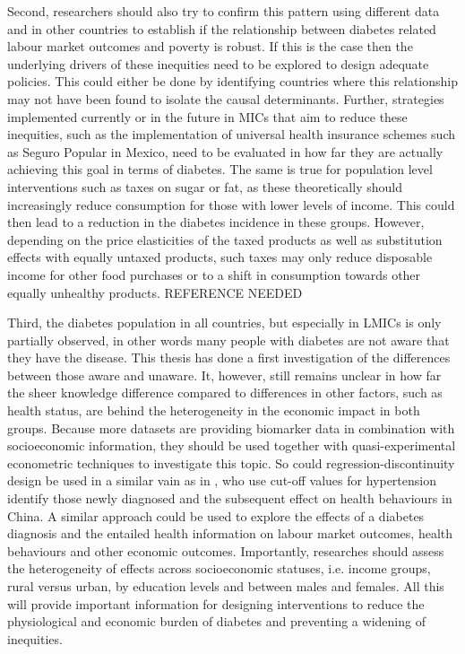 Second, researchers should also try to confirm this pattern using different data and in other countries to establish if the relationship between diabetes related labour market outcomes and poverty is robust. If this is the case then the underlying drivers of these inequities need to be explored to design adequate policies. This could either be done by identifying countries where this relationship may not have been found to isolate the causal determinants. Further, strategies implemented currently or in the future in \acp{MIC} that aim to reduce these inequities, such as the implementation of universal health insurance schemes such as Seguro Popular in Mexico, need to be evaluated in how far they are actually achieving this goal in terms of diabetes. The same is true for population level interventions such as taxes on sugar or fat, as these theoretically should increasingly reduce consumption for those with lower levels of income. This could then lead to a reduction in the diabetes incidence in these groups. However, depending on the price elasticities of the taxed products as well as substitution effects with equally untaxed products, such taxes may only reduce disposable income for other food purchases or to a shift in consumption towards other equally unhealthy products. REFERENCE NEEDED


Third, the diabetes population in all countries, but especially in \acp{LMIC} is only partially observed, in other words many people with diabetes are not aware that they have the disease. This thesis has done a first investigation of the differences between those aware and unaware. It, however, still remains unclear in how far the sheer knowledge difference compared to differences in other factors, such as health status, are behind the heterogeneity in the economic impact in both groups. Because more datasets are providing biomarker data in combination with socioeconomic information, they should be used together with quasi-experimental econometric techniques to investigate this topic. So could regression-discontinuity design be used in a similar vain as in \textcite{Zhao2013a}, who use cut-off values for hypertension identify those newly diagnosed and the subsequent effect on health behaviours in China. A similar approach could be used to explore the effects of a diabetes diagnosis and the entailed health information on labour market outcomes, health behaviours and other economic outcomes. Importantly, researches should assess the heterogeneity of effects across socioeconomic statuses, i.e. income groups, rural versus urban, by education levels and between males and females. All this will provide important information for designing interventions to reduce the physiological and economic burden of diabetes and preventing a widening of inequities.

